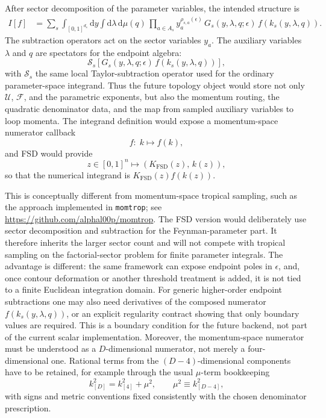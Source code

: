 \documentclass[11pt]{article}
\newcommand{\dd}{\mathrm d}
\newcommand{\eps}{\epsilon}
\newcommand{\U}{\mathcal U}
\newcommand{\F}{\mathcal F}
\begin{document}
After sector decomposition of the parameter variables, the intended structure
is
\begin{align}
  I[f]
  &=
  \sum_s
  \int_{[0,1]^{d_s}}\dd y
  \int\dd\lambda\,\dd\mu(q)\,
  \prod_{a\in A_s}y_a^{\rho_{s,a}(\eps)}
  \,
  G_s(y,\lambda,q;\eps)\,
  f\!\left(k_s(y,\lambda,q)\right).
\end{align}
The subtraction operators act on the sector variables \(y_a\).  The auxiliary
variables \(\lambda\) and \(q\) are spectators for the endpoint algebra:
\begin{equation}
  \mathcal S_s
  \left[
    G_s(y,\lambda,q;\eps)\,
    f(k_s(y,\lambda,q))
  \right],
\end{equation}
with \(\mathcal S_s\) the same local Taylor-subtraction operator used for the
ordinary parameter-space integrand.  Thus the future topology object would
store not only \(\U\), \(\F\), and the parametric exponents, but also the
momentum routing, the quadratic denominator data, and the map from sampled
auxiliary variables to loop momenta.  The integrand definition would expose a
momentum-space numerator callback
\begin{equation}
  f:\; k \longmapsto f(k),
\end{equation}
and FSD would provide
\begin{equation}
  z\in[0,1]^n
  \longmapsto
  \left(K_{\mathrm{FSD}}(z),\,k(z)\right),
\end{equation}
so that the numerical integrand is \(K_{\mathrm{FSD}}(z)f(k(z))\).

This is conceptually different from momentum-space tropical sampling, such as
the approach implemented in \texttt{momtrop}; see
\url{https://github.com/alphal00p/momtrop}.  The FSD version would deliberately
use sector decomposition and subtraction for the Feynman-parameter part.  It
therefore inherits the larger sector count and will not compete with tropical
sampling on the factorial-sector problem for finite parameter integrals.  The
advantage is different: the same framework can expose endpoint poles in
\(\eps\), and, once contour deformation or another threshold treatment is
added, it is not tied to a finite Euclidean integration domain.  For generic
higher-order endpoint subtractions one may also need derivatives of the
composed numerator \(f(k_s(y,\lambda,q))\), or an explicit regularity contract
showing that only boundary values are required.  This is a boundary condition
for the future backend, not part of the current scalar implementation.
Moreover, the momentum-space numerator must be understood as a
\(D\)-dimensional numerator, not merely a four-dimensional one.  Rational
terms from the \((D-4)\)-dimensional components have to be retained, for
example through the usual \(\mu\)-term bookkeeping
\begin{equation}
  k_{[D]}^2
  =
  k_{[4]}^2
  +
  \mu^2,
  \qquad
  \mu^2 \equiv k_{[D-4]}^2 ,
\end{equation}
with signs and metric conventions fixed consistently with the chosen
denominator prescription.
\end{document}
